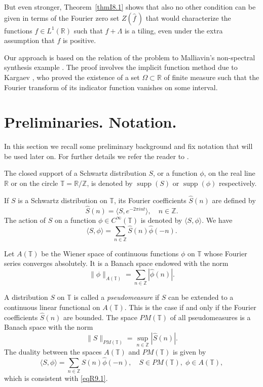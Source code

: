 \documentclass[reqno,a4paper,12pt]{amsart}
\numberwithin{equation}{section}
\numberwithin{figure}{section}
\newcommand\R{\mathbb{R}}
\newcommand\Z{\mathbb{Z}}
\newcommand\T{\mathbb{T}}
\newcommand\Lam{\Lambda}
\newcommand\1{\mathds{1}}
\newcommand{\ft}[1]{\widehat{#1}}
\newcommand{\dotprod}[2]{\langle #1 , #2 \rangle}
\newcommand{\supp}{\operatorname{supp}}
\newcommand{\zfft}{Z(\ft{f}\,)}
\theoremstyle{plain}
\newcommand{\thmref}[1]{Theorem~\ref{#1}}
\theoremstyle{definition}
\begin{document}
But even stronger,  \thmref{thmI8.1}
shows that also no other condition can be given
in terms of the Fourier  zero set  $\zfft$ 
that would characterize
 the functions $f \in L^1(\mathbb{R})$ such
that $f + \Lam$ is a tiling,
even under the extra assumption
that $f$ is positive.



Our approach is based on the relation of the problem to
 Malliavin's non-spectral synthesis example \cite{Mal59c}.
The proof  involves the implicit function method
 due to Kargaev \cite{Kar82}, who proved the existence
of a set $\Omega\subset \mathbb R$ of finite measure
 such that the Fourier transform of its indicator function
vanishes on some interval.

	


\section{Preliminaries. Notation.}


In this section we recall some preliminary background 
and fix notation that will be used later on. 
For further details we refer the reader to \cite{Kah70}.

The closed support of 
 a Schwartz distribution $S$, or a function $\phi$,
on the real line $\R$ or on the circle  $\T = \R / \Z$,
is denoted by $\supp(S)$ or $\supp(\phi)$ respectively.

If $S$ is a Schwartz distribution on $\T$,
its Fourier coefficients $\ft{S}(n)$ are defined by
\[
\ft{S}(n) = \dotprod{S}{e^{-2 \pi i n t}}, \quad n \in \Z.
\]
The action of $S$ on a function $\phi \in C^\infty(\T)$
is denoted by $\dotprod{S}{\phi}$. We have
\begin{equation}
\label{eqR9.1}
\dotprod{S}{\phi} =  \sum_{n \in \Z} \ft{S}(n)\ft{\phi}(-n).
\end{equation}


Let $A(\T)$ be the
Wiener space of continuous functions $\phi$ on   $\T$ 
whose Fourier series converges absolutely.
 It is a Banach space endowed with the norm
\[
\|\phi\|_{A(\T)} = \sum_{n \in \Z} |\ft{\phi}(n)|.
\]

A distribution $S$ on $\T$ is called a \emph{pseudomeasure}
if $S$ can be extended
to a continuous linear functional on $A(\T)$. 
This is the case if and only if
the Fourier coefficients $\ft{S}(n)$ are bounded.
The space  $PM(\T)$ of  all pseudomeasures  
is a Banach space with the norm
\[
\|S\|_{PM(\T)} = \sup_{n \in \Z} |\ft{S}(n)|.
\] 
The duality
between the spaces $A(\T)$ and $PM(\T)$
is given by
\begin{equation}
\label{eqR9.2}
\dotprod{S}{\phi} =  \sum_{n \in \Z} \ft{S}(n)\ft{\phi}(-n),
\quad S \in PM(\T), \; \phi \in A(\T),
\end{equation}
which is consistent with \eqref{eqR9.1}.
\end{document}
